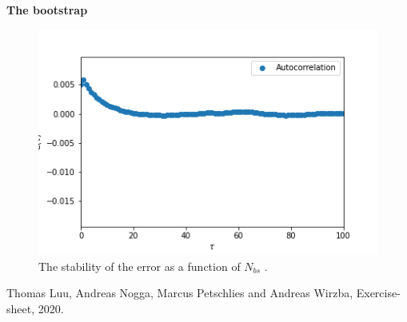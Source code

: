 \documentclass[11pt, a4paper, DIV=12]{scrartcl}
\begin{document}
\textbf{The bootstrap}	
\begin{figure}[H]
	\centering
	\includegraphics[width=0.6\linewidth]{autokorrelation.png}
	\caption{ The stability of the error as a function of $ N_{bs} $ .}
	\label{fig:boottrap}
\end{figure}	
	\begin{thebibliography}{12}
		Thomas Luu, Andreas Nogga, Marcus Petschlies and  Andreas Wirzba, Exercise-sheet, 2020. 
		
		
	\end{thebibliography}	
\end{document}
